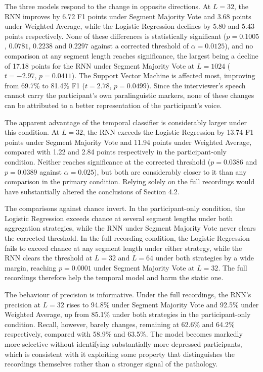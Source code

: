 \documentclass{mproj}
\begin{document}
The three models respond to the change in opposite directions. At $L = 32$, the RNN improves by 6.72 F1 points under Segment Majority Vote and 3.68 points under Weighted Average, while the Logistic Regression declines by 5.80 and 5.43 points respectively. None of these differences is statistically significant ($p = 0.1005$, $0.0781$, $0.2238$ and $0.2297$ against a corrected threshold of $\alpha = 0.0125$), and no comparison at any segment length reaches significance, the largest being a decline of 17.18 points for the RNN under Segment Majority Vote at $L = 1024$ ($t = -2.97$, $p = 0.0411$). The Support Vector Machine is affected most, improving from 69.7\% to 81.4\% F1 ($t = 2.78$, $p = 0.0499$). Since the interviewer's speech cannot carry the participant's own paralinguistic markers, none of these changes can be attributed to a better representation of the participant's voice.

The apparent advantage of the temporal classifier is considerably larger under this condition. At $L = 32$, the RNN exceeds the Logistic Regression by 13.74 F1 points under Segment Majority Vote and 11.94 points under Weighted Average, compared with 1.22 and 2.84 points respectively in the participant-only condition. Neither reaches significance at the corrected threshold ($p = 0.0386$ and $p = 0.0389$ against $\alpha = 0.025$), but both are considerably closer to it than any comparison in the primary condition. Relying solely on the full recordings would have substantially altered the conclusions of Section 4.2.

The comparisons against chance invert. In the participant-only condition, the Logistic Regression exceeds chance at several segment lengths under both aggregation strategies, while the RNN under Segment Majority Vote never clears the corrected threshold. In the full-recording condition, the Logistic Regression fails to exceed chance at any segment length under either strategy, while the RNN clears the threshold at $L = 32$ and $L = 64$ under both strategies by a wide margin, reaching $p = 0.0001$ under Segment Majority Vote at $L = 32$. The full recordings therefore help the temporal model and harm the static one.

The behaviour of precision is informative. Under the full recordings, the RNN's precision at $L = 32$ rises to 94.8\% under Segment Majority Vote and 92.5\% under Weighted Average, up from 85.1\% under both strategies in the participant-only condition. Recall, however, barely changes, remaining at 62.6\% and 64.2\% respectively, compared with 58.9\% and 63.5\%. The model becomes markedly more selective without identifying substantially more depressed participants, which is consistent with it exploiting some property that distinguishes the recordings themselves rather than a stronger signal of the pathology.
\end{document}
